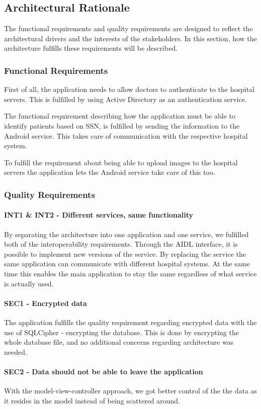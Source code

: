 

\subsection{Architectural Rationale}
\label{architectualRationale}
The functional requirements and quality requirements are designed to reflect the architectural drivers and the interests of the stakeholders. In this section, how the architecture fulfills these requirements will be described.

\subsubsection{Functional Requirements}
First of all, the application needs to allow doctors to authenticate to the hospital servers. This is fulfilled by using Active Directory as an authentication service.

The functional requirement describing how the application must be able to identify patients based on SSN, is fulfilled by sending the information to the Android service. This takes care of communication with the respective hospital system.

To fulfill the requirement about being able to upload images to the hospital servers the application lets the Android service take care of this too.

\subsubsection{Quality Requirements}

\paragraph*{INT1 \& INT2 - Different services, same functionality}
By separating the architecture into one application and one service, we fulfilled both of the interoperability requirements. Through the AIDL interface, it is possible to implement new versions of the service. By replacing the service the same application can communicate with different hospital systems. At the same time this enables the main application to stay the same regardless of what service is actually used.

\paragraph*{SEC1 - Encrypted data}
The application fulfills the quality requirement regarding encrypted data with the use of SQLCipher - encrypting the database. This is done by encrypting the whole database file, and no additional concerns regarding architecture was needed.

\paragraph*{SEC2 - Data should not be able to leave the application}
With the model-view-controller approach, we got better control of the the data as it resides in the model instead of being scattered around.
